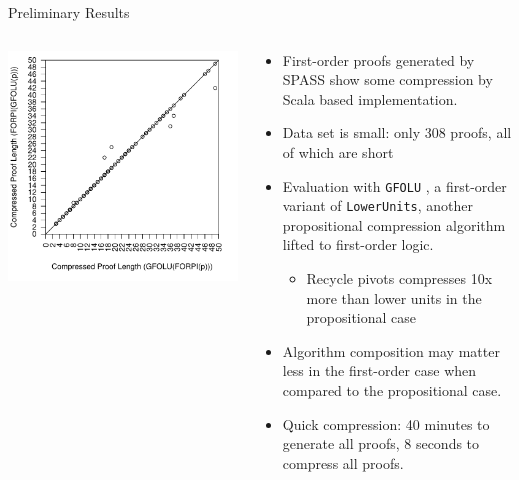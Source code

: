 \documentclass[final]{beamer} %
\begin{document}
\begin{frame}{}
\begin{columns}
\begin{column}{0.3\textwidth}
\begin{block}{Preliminary Results}
\begin{columns}
\begin{column}{0.35\textwidth}
\includegraphics[scale=1]{images/forpi-folu-vs-folu-forpi-length_vs_compress_length_all_proofs.pdf}
\end{column}
\begin{column}{0.65\textwidth}
\begin{itemize}
\item First-order proofs generated by SPASS show some compression by Scala based implementation.
\item Data set is small: only 308 proofs, all of which are short
\item Evaluation with \texttt{GFOLU} \cite{GFOLU}, a first-order variant of \texttt{LowerUnits}, another propositional compression algorithm lifted to first-order logic.
\begin{itemize}
\item Recycle pivots compresses 10x more than lower units in the propositional case
\end{itemize}
\item Algorithm composition may matter less in the first-order case when compared to the propositional case.
\item Quick compression: 40 minutes to generate all proofs, 8 seconds to compress all proofs.
\end{itemize}
\end{column}
\end{columns}
    \end{block}
    


\end{column}
\end{columns}
\end{frame}
\end{document}
